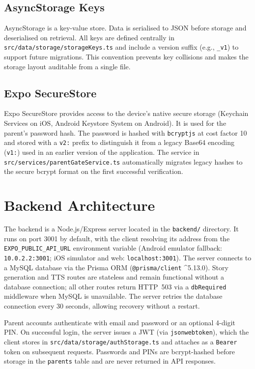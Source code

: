\subsection*{AsyncStorage Keys}

AsyncStorage is a key-value store. Data is serialised to JSON before storage and deserialised on retrieval. All keys are defined centrally in \texttt{src/data/storage/storageKeys.ts} and include a version suffix (e.g., \texttt{\_v1}) to support future migrations. This convention prevents key collisions and makes the storage layout auditable from a single file.

\subsection*{Expo SecureStore}

Expo SecureStore provides access to the device's native secure storage (Keychain Services on iOS, Android Keystore System on Android). It is used for the parent's password hash. The password is hashed with \texttt{bcryptjs} at cost factor 10 and stored with a \texttt{v2:} prefix to distinguish it from a legacy Base64 encoding (\texttt{v1:}) used in an earlier version of the application. The service in \texttt{src/services/parentGateService.ts} automatically migrates legacy hashes to the secure bcrypt format on the first successful verification.

\section{Backend Architecture}

The backend is a Node.js/Express server located in the \texttt{backend/} directory. It runs on port 3001 by default, with the client resolving its address from the \texttt{EXPO\_PUBLIC\_API\_URL} environment variable (Android emulator fallback: \texttt{10.0.2.2:3001}; iOS simulator and web: \texttt{localhost:3001}). The server connects to a MySQL database via the Prisma ORM (\texttt{@prisma/client} \^{}5.13.0). Story generation and TTS routes are stateless and remain functional without a database connection; all other routes return HTTP~503 via a \texttt{dbRequired} middleware when MySQL is unavailable. The server retries the database connection every 30 seconds, allowing recovery without a restart.

Parent accounts authenticate with email and password or an optional 4-digit PIN. On successful login, the server issues a JWT (via \texttt{jsonwebtoken}), which the client stores in \texttt{src/data/storage/authStorage.ts} and attaches as a \texttt{Bearer} token on subsequent requests. Passwords and PINs are bcrypt-hashed before storage in the \texttt{parents} table and are never returned in API responses.

